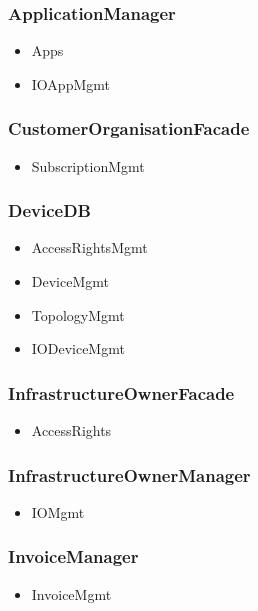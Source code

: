 {{{    \subsubsection{ApplicationManager}
        \begin{itemize}
            \item Apps
            \item IOAppMgmt
        \end{itemize}

    \subsubsection{CustomerOrganisationFacade}
        \begin{itemize}
            \item SubscriptionMgmt
        \end{itemize}

    \subsubsection{DeviceDB}
        \begin{itemize}
            \item AccessRightsMgmt
            \item DeviceMgmt
            \item TopologyMgmt
            \item IODeviceMgmt
        \end{itemize}

    \subsubsection{InfrastructureOwnerFacade}
        \begin{itemize}
            \item AccessRights
        \end{itemize}

    \subsubsection{InfrastructureOwnerManager}
        \begin{itemize}
            \item IOMgmt
        \end{itemize}

    \subsubsection{InvoiceManager}
        \begin{itemize}
            \item InvoiceMgmt
        \end{itemize}

}}}
